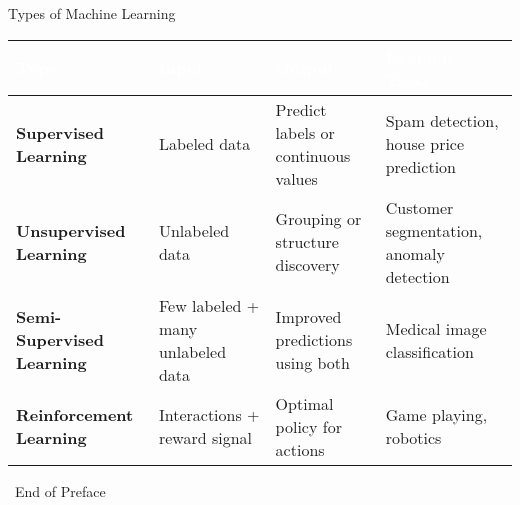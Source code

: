 \documentclass[serif, aspectratio=169]{beamer}
\begin{document}
\begin{frame}{Types of Machine Learning}
    \scriptsize %
    \renewcommand{\arraystretch}{1.4} %
    \setlength{\tabcolsep}{3pt} %
    \begin{tabular}{|>{\raggedright\arraybackslash}p{2.5cm}|
                    >{\raggedright\arraybackslash}p{3.0cm}|
                    >{\raggedright\arraybackslash}p{3.5cm}|
                    >{\raggedright\arraybackslash}p{4.0cm}|}
        \hline
        \rowcolor{blue} %
        \textcolor{white}{\textbf{Type}} & 
        \textcolor{white}{\textbf{Input}} & 
        \textcolor{white}{\textbf{Output}} & 
        \textcolor{white}{\textbf{Example Tasks}} \\ \hline
        
        \textbf{Supervised Learning} & 
        Labeled data & 
        Predict labels or continuous values & 
        Spam detection, house price prediction \\ \hline
        
        \textbf{Unsupervised Learning} & 
        Unlabeled data & 
        Grouping or structure discovery & 
        Customer segmentation, anomaly detection \\ \hline
        
        \textbf{Semi-Supervised Learning} & 
        Few labeled + many unlabeled data & 
        Improved predictions using both & 
        Medical image classification \\ \hline
        
        \textbf{Reinforcement Learning} & 
        Interactions + reward signal & 
        Optimal policy for actions & 
        Game playing, robotics \\ \hline
    \end{tabular}
\end{frame}


\begin{frame}
    \begin{center}
        {\Huge\ End of Preface}
    \end{center}
\end{frame}
\end{document}
